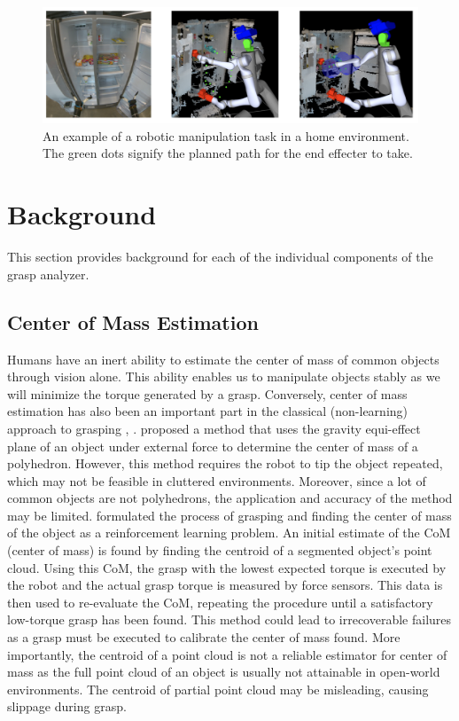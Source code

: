 \documentclass[12pt]{ucsddissertation}
\begin{document}
\begin{figure}
	\centering
	\includegraphics[width=\linewidth]{figures/exampleTask.png}
	\caption[An example of a pick-and-place task]{An example of a robotic manipulation task in a home environment. The green dots signify the planned path for the end effecter to take. \cite{Cheng_Shankar_Burdick_2020}}
	\label{fig:exampleTask}
\end{figure}

\chapter{Background}
This section provides background for each of the individual components of the grasp analyzer.

\section{Center of Mass Estimation}
Humans have an inert ability to estimate the center of mass of common objects through vision alone. This ability enables us to manipulate objects stably as we will minimize the torque generated by a grasp. Conversely, center of mass estimation has also been an important part in the classical (non-learning) approach to grasping \cite{Kanoulas_Lee_Caldwell_Tsagarakis_2018}, \cite{Yong_Yu_Fukuda_Tsujio_1999}. \cite{Yong_Yu_Fukuda_Tsujio_1999} proposed a method that uses the gravity equi-effect plane of an object under external force to determine the center of mass of a polyhedron. However, this method requires the robot to tip the object repeated, which may not be feasible in cluttered environments. Moreover, since a lot of common objects are not polyhedrons, the application and accuracy of the method may be limited. \cite{Kanoulas_Lee_Caldwell_Tsagarakis_2018} formulated the process of grasping and finding the center of mass of the object as a reinforcement learning problem. An initial estimate of the CoM (center of mass) is found by finding the centroid of a segmented object's point cloud. Using this CoM, the grasp with the lowest expected torque is executed by the robot and the actual grasp torque is measured by force sensors. This data is then used to re-evaluate the CoM, repeating the procedure until a satisfactory low-torque grasp has been found. This method could lead to irrecoverable failures as a grasp must be executed to calibrate the center of mass found. More importantly, the centroid of a point cloud is not a reliable estimator for center of mass as the full point cloud of an object is usually not attainable in open-world environments. The centroid of partial point cloud may be misleading, causing slippage during grasp.
\end{document}
